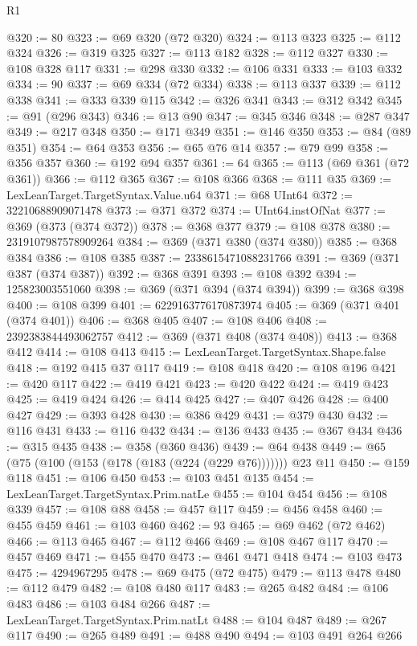 \begin{lexlean}{R1}
\begin{coremodule}
@320 := 80
@323 := @69 @320 (@72 @320)
@324 := @113 @323
@325 := @112 @324
@326 := @319 @325
@327 := @113 @182
@328 := @112 @327
@330 := @108 @328 @117
@331 := @298 @330
@332 := @106 @331
@333 := @103 @332
@334 := 90
@337 := @69 @334 (@72 @334)
@338 := @113 @337
@339 := @112 @338
@341 := @333 @339 @115
@342 := @326 @341
@343 := @312 @342
@345 := @91 (@296 @343)
@346 := @13 @90
@347 := @345 @346
@348 := @287 @347
@349 := @217 @348
@350 := @171 @349
@351 := @146 @350
@353 := @84 (@89 @351)
@354 := @64 @353
@356 := @65 @76 @14
@357 := @79 @99
@358 := @356 @357
@360 := @192 @94 @357
@361 := 64
@365 := @113 (@69 @361 (@72 @361))
@366 := @112 @365
@367 := @108 @366
@368 := @111 @35
@369 := LexLeanTarget.TargetSyntax.Value.u64
@371 := @68 UInt64
@372 := 32210688909071478
@373 := @371 @372
@374 := UInt64.instOfNat
@377 := @369 (@373 (@374 @372))
@378 := @368 @377
@379 := @108 @378
@380 := 2319107987578909264
@384 := @369 (@371 @380 (@374 @380))
@385 := @368 @384
@386 := @108 @385
@387 := 2338615471088231766
@391 := @369 (@371 @387 (@374 @387))
@392 := @368 @391
@393 := @108 @392
@394 := 125823003551060
@398 := @369 (@371 @394 (@374 @394))
@399 := @368 @398
@400 := @108 @399
@401 := 6229163776170873974
@405 := @369 (@371 @401 (@374 @401))
@406 := @368 @405
@407 := @108 @406
@408 := 2392383844493062757
@412 := @369 (@371 @408 (@374 @408))
@413 := @368 @412
@414 := @108 @413
@415 := LexLeanTarget.TargetSyntax.Shape.false
@418 := @192 @415 @37 @117
@419 := @108 @418
@420 := @108 @196
@421 := @420 @117
@422 := @419 @421
@423 := @420 @422
@424 := @419 @423
@425 := @419 @424
@426 := @414 @425
@427 := @407 @426
@428 := @400 @427
@429 := @393 @428
@430 := @386 @429
@431 := @379 @430
@432 := @116 @431
@433 := @116 @432
@434 := @136 @433
@435 := @367 @434
@436 := @315 @435
@438 := @358 (@360 @436)
@439 := @64 @438
@449 := @65 (@75 (@100 (@153 (@178 (@183 (@224 (@229 @76))))))) @23 @11
@450 := @159 @118
@451 := @106 @450
@453 := @103 @451 @135
@454 := LexLeanTarget.TargetSyntax.Prim.natLe
@455 := @104 @454
@456 := @108 @339
@457 := @108 @88
@458 := @457 @117
@459 := @456 @458
@460 := @455 @459
@461 := @103 @460
@462 := 93
@465 := @69 @462 (@72 @462)
@466 := @113 @465
@467 := @112 @466
@469 := @108 @467 @117
@470 := @457 @469
@471 := @455 @470
@473 := @461 @471 @418
@474 := @103 @473
@475 := 4294967295
@478 := @69 @475 (@72 @475)
@479 := @113 @478
@480 := @112 @479
@482 := @108 @480 @117
@483 := @265 @482
@484 := @106 @483
@486 := @103 @484 @266
@487 := LexLeanTarget.TargetSyntax.Prim.natLt
@488 := @104 @487
@489 := @267 @117
@490 := @265 @489
@491 := @488 @490
@494 := @103 @491 @264 @266

\end{coremodule}
\end{lexlean}
